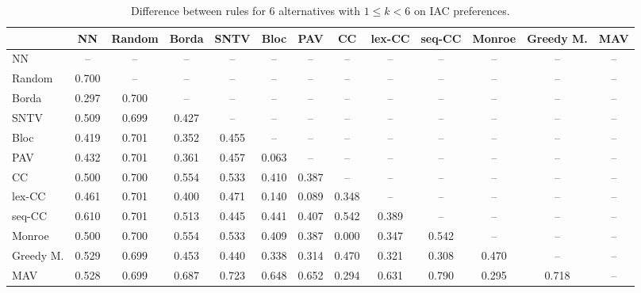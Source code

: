 
\begin{table*}[htbp]
\centering
\begin{tabular}{lcccccccccccc}
\toprule
 & NN & Random & Borda & SNTV & Bloc & PAV & CC & lex-CC & seq-CC & Monroe & Greedy M. & MAV \\
\midrule
NN & -- & -- & -- & -- & -- & -- & -- & -- & -- & -- & -- & -- \\
Random & \cellcolor{blue!70} 0.700 & -- & -- & -- & -- & -- & -- & -- & -- & -- & -- & -- \\
Borda & \cellcolor{blue!29} 0.297 & \cellcolor{blue!70} 0.700 & -- & -- & -- & -- & -- & -- & -- & -- & -- & -- \\
SNTV & \cellcolor{blue!50} 0.509 & \cellcolor{blue!69} 0.699 & \cellcolor{blue!42} 0.427 & -- & -- & -- & -- & -- & -- & -- & -- & -- \\
Bloc & \cellcolor{blue!41} 0.419 & \cellcolor{blue!70} 0.701 & \cellcolor{blue!35} 0.352 & \cellcolor{blue!45} 0.455 & -- & -- & -- & -- & -- & -- & -- & -- \\
PAV & \cellcolor{blue!43} 0.432 & \cellcolor{blue!70} 0.701 & \cellcolor{blue!36} 0.361 & \cellcolor{blue!45} 0.457 & \cellcolor{blue!6} 0.063 & -- & -- & -- & -- & -- & -- & -- \\
CC & \cellcolor{blue!50} 0.500 & \cellcolor{blue!70} 0.700 & \cellcolor{blue!55} 0.554 & \cellcolor{blue!53} 0.533 & \cellcolor{blue!41} 0.410 & \cellcolor{blue!38} 0.387 & -- & -- & -- & -- & -- & -- \\
lex-CC & \cellcolor{blue!46} 0.461 & \cellcolor{blue!70} 0.701 & \cellcolor{blue!40} 0.400 & \cellcolor{blue!47} 0.471 & \cellcolor{blue!14} 0.140 & \cellcolor{blue!8} 0.089 & \cellcolor{blue!34} 0.348 & -- & -- & -- & -- & -- \\
seq-CC & \cellcolor{blue!61} 0.610 & \cellcolor{blue!70} 0.701 & \cellcolor{blue!51} 0.513 & \cellcolor{blue!44} 0.445 & \cellcolor{blue!44} 0.441 & \cellcolor{blue!40} 0.407 & \cellcolor{blue!54} 0.542 & \cellcolor{blue!38} 0.389 & -- & -- & -- & -- \\
Monroe & \cellcolor{blue!50} 0.500 & \cellcolor{blue!70} 0.700 & \cellcolor{blue!55} 0.554 & \cellcolor{blue!53} 0.533 & \cellcolor{blue!40} 0.409 & \cellcolor{blue!38} 0.387 & \cellcolor{blue!0} 0.000 & \cellcolor{blue!34} 0.347 & \cellcolor{blue!54} 0.542 & -- & -- & -- \\
Greedy M. & \cellcolor{blue!52} 0.529 & \cellcolor{blue!69} 0.699 & \cellcolor{blue!45} 0.453 & \cellcolor{blue!44} 0.440 & \cellcolor{blue!33} 0.338 & \cellcolor{blue!31} 0.314 & \cellcolor{blue!47} 0.470 & \cellcolor{blue!32} 0.321 & \cellcolor{blue!30} 0.308 & \cellcolor{blue!47} 0.470 & -- & -- \\
MAV & \cellcolor{blue!52} 0.528 & \cellcolor{blue!69} 0.699 & \cellcolor{blue!68} 0.687 & \cellcolor{blue!72} 0.723 & \cellcolor{blue!64} 0.648 & \cellcolor{blue!65} 0.652 & \cellcolor{blue!29} 0.294 & \cellcolor{blue!63} 0.631 & \cellcolor{blue!79} 0.790 & \cellcolor{blue!29} 0.295 & \cellcolor{blue!71} 0.718 & -- \\
\bottomrule
\end{tabular}

\caption{Difference between rules for 6 alternatives with $1 \leq k < 6$ on IAC preferences.}
\label{tab:rule_distance_heatmap-m=[6]-pref_dist=IAC}
\end{table*}
    